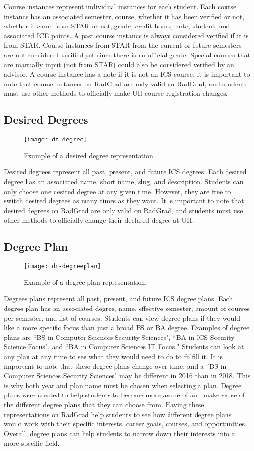 Course instances represent individual instances for each student. Each course instance has an associated semester, course, whether it has been verified or not, whether it came from STAR or not, grade, credit hours, note, student, and associated ICE points. A past course instance is always considered verified if it is from STAR. Course instances from STAR from the current or future semesters are not considered verified yet since there is no official grade. Special courses that are manually input (not from STAR) could also be considered verified by an advisor. A course instance has a note if it is not an ICS course. It is important to note that course instances on RadGrad are only valid on RadGrad, and students must use other methods to officially make UH course registration changes.

\subsection{Desired Degrees}
\begin{figure}[h]
\centering
\texttt{[image: dm-degree]}
\caption{Example of a desired degree representation.}
\end{figure}
Desired degrees represent all past, present, and future ICS degrees. Each desired degree has an associated name, short name, slug, and description. Students can only choose one desired degree at any given time. However, they are free to switch desired degrees as many times as they want. It is important to note that desired degrees on RadGrad are only valid on RadGrad, and students must use other methods to officially change their declared degree at UH. 

\subsection{Degree Plan}
\begin{figure}[h]
\centering
\texttt{[image: dm-degreeplan]}
\caption{Example of a degree plan representation.}
\end{figure}
Degrees plans represent all past, present, and future ICS degree plans. Each degree plan has an associated degree, name, effective semester, amount of courses per semester, and list of courses. Students can view degree plans if they would like a more specific focus than just a broad BS or BA degree. Examples of degree plans are ``BS in Computer Sciences Security Sciences", ``BA in ICS Security Science Focus", and ``BA in Computer Sciences IT Focus." Students can look at any plan at any time to see what they would need to do to fulfill it. It is important to note that these degree plans change over time, and a ``BS in Computer Sciences Security Sciences" may be different in 2016 than in 2018. This is why both year and plan name must be chosen when selecting a plan.  Degree plans were created to help students to become more aware of and make sense of the different degree plans that they can choose from. Having these representations on RadGrad help students to see how different degree plans would work with their specific interests, career goals, courses, and opportunities. Overall, degree plans can help students to narrow down their interests into a more specific field. 

